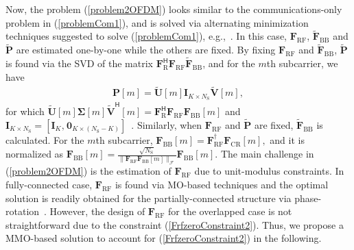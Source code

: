 \documentclass[journal,10pt]{IEEEtran}
\begin{document}
{		Now, the problem (\ref{problem2OFDM}) looks similar to the communications-only problem in (\ref{problemCom1}), and is solved via alternating minimization techniques suggested to solve (\ref{problemCom1}), e.g.,~\cite{heath2016overview,hybridBFAltMin}. In this case, $\mathbf{F}_\mathrm{RF}$, $\widetilde{\mathbf{F}}_\mathrm{BB}$ and $\widetilde{\mathbf{P}}$ are estimated one-by-one while the others are fixed. By fixing $\mathbf{F}_\mathrm{RF}$ and $\widetilde{\mathbf{F}}_\mathrm{BB}$,  $\widetilde{\mathbf{P}}$ is found via the SVD of the matrix $\mathbf{F}_\mathrm{R}^\textsf{H}\mathbf{F}_\mathrm{RF}\widetilde{\mathbf{F}}_\mathrm{BB}$, and for the $m$th subcarrier, we have 
		\begin{align}
		\label{computeP}
		\mathbf{P}[m] = \widetilde{\mathbf{U}}[m] \mathbf{I}_{K\times N_\mathrm{S}}\widetilde{\mathbf{V}}[m],
		\end{align}
		for which $\widetilde{\mathbf{U}}[m] \boldsymbol{\Sigma}[m]\widetilde{\mathbf{V}}^\textsf{H}[m] = \mathbf{F}_\mathrm{R}^\textsf{H}\mathbf{F}_\mathrm{RF}\mathbf{F}_\mathrm{BB}[m]$ and $\mathbf{I}_{K\times N_\mathrm{S}} = [\mathbf{I}_{K}, \hspace{1pt} \boldsymbol{0}_{K \times (N_\mathrm{S} -K)}]$~\cite{heath2016overview}. Similarly, when $\mathbf{F}_\mathrm{RF}$ and $\widetilde{\mathbf{P}}$ are fixed, $\widetilde{\mathbf{F}}_\mathrm{BB}$ is calculated. For the $m$th subcarrier,  $	\mathbf{F}_\mathrm{BB}[m] = \mathbf{F}_\mathrm{RF}^\dagger \mathbf{F}_\mathrm{CR}[m],$
		and it is normalized as $\mathbf{F}_\mathrm{BB}[m] = \frac{\sqrt{N_\mathrm{S}}}{\| \mathbf{F}_\mathrm{RF}\mathbf{F}_\mathrm{BB}[m]\|_\mathcal{F}}\mathbf{F}_\mathrm{BB}[m]$. 
	}
	The main challenge in (\ref{problem2OFDM}) is the estimation of $\mathbf{F}_\mathrm{RF}$ due to unit-modulus constraints. In fully-connected case, $\mathbf{F}_\mathrm{RF}$ is found via MO-based techniques and the optimal solution is readily obtained for the partially-connected structure via phase-rotation~\cite{hybridBFAltMin,radarCommLiuICASSP2019}. However, the design of $\mathbf{F}_\mathrm{RF}$ for the overlapped case is not straightforward due to the constraint (\ref{FrfzeroConstraint2}). Thus, we propose a MMO-based solution to account for (\ref{FrfzeroConstraint2}) in the following. 
	
\end{document}
